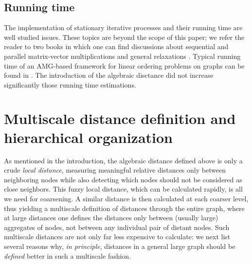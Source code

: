 \documentclass[final]{siamltex}
\begin{document}
\subsection{Running time}
\par The implementation of stationary iterative processes and their running time are well studied issues. These topics are beyond the scope of this paper; we refer the reader to two books in which one can find discussions about sequential and parallel matrix-vector multiplications and general relaxations \cite{Grama,heath}. Typical running time of an AMG-based framework for linear ordering problems on graphs can be found in \cite{safro2003,safro2004,safro2005}. The introduction of the algebraic disctance did not increase significantly those running time estimations.

\section{Multiscale distance definition and hierarchical organization}\label{multiscale}
As mentioned in the introduction, the algebraic distance defined
above is only a crude {\it local distance}, measuring meaningful
relative distances only between neighboring nodes while also
detecting which nodes should not be considered as close neighbors.
This fuzzy local distance, which can be calculated rapidly, is
all we need for coarsening. A similar distance is then
calculated at each coarser level, thus yielding a multiscale
definition of distances through the entire graph, where at large
distances one defines the distances only between (usually large)
aggregates of nodes, not between any individual pair of distant
nodes. Such multiscale distances are not only far less expensive
to calculate: we next list several reasons why, {\it in principle},
distances in a general large graph should be {\it defined} better
in such a multiscale fashion.
\end{document}
